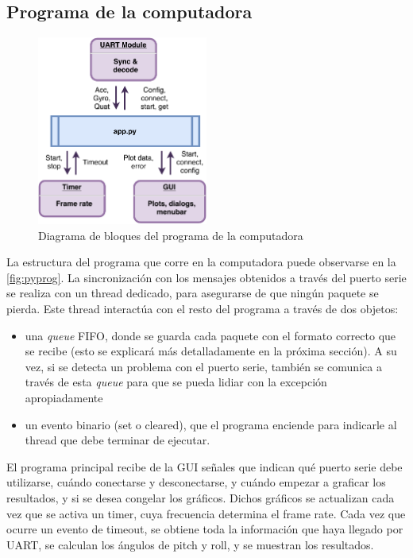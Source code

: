 \documentclass{article}
\begin{document}
\subsection{Programa de la computadora}

\begin{figure}[ht]
	\centering
	\includegraphics[width=0.5\textwidth]{imgs/pyprog.pdf}
	\caption{Diagrama de bloques del programa de la computadora}
	\label{fig:pyprog}
\end{figure}

La estructura del programa que corre en la computadora puede observarse en la \autoref{fig:pyprog}. La sincronizaci\'on con los mensajes obtenidos a trav\'es del puerto serie se realiza con un thread dedicado, para asegurarse de que ning\'un paquete se pierda. Este thread interact\'ua con el resto del programa a trav\'es de dos objetos:
\begin{itemize}
	\item una \emph{queue} FIFO, donde se guarda cada paquete con el formato correcto que se recibe (esto se explicar\'a m\'as detalladamente en la pr\'oxima secci\'on). A su vez, si se detecta un problema con el puerto serie, tambi\'en se comunica a trav\'es de esta \emph{queue} para que se pueda lidiar con la excepci\'on apropiadamente
	\item un evento binario (set o cleared), que el programa enciende para indicarle al thread que debe terminar de ejecutar.  
\end{itemize}

El programa principal recibe de la GUI se\~nales que indican qu\'e puerto serie debe utilizarse, cu\'ando conectarse y desconectarse, y cu\'ando empezar a graficar los resultados, y si se desea congelar los gr\'aficos. Dichos gr\'aficos se actualizan cada vez que se activa un timer, cuya frecuencia determina el frame rate. Cada vez que ocurre un evento de timeout, se obtiene toda la informaci\'on que haya llegado por UART, se calculan los \'angulos de pitch y roll, y se muestran los resultados. 
\end{document}

